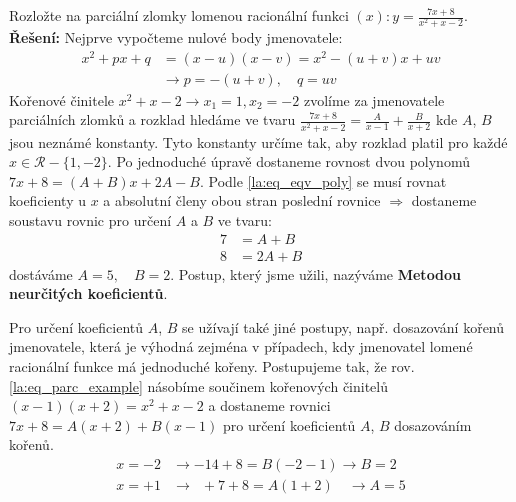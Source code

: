 \begin{example}\label{mai:exam015}
  Rozložte na parciální zlomky lomenou racionální funkci \((x):y=\frac{7x+8}{x^2+x-2}\).
  \newline\textbf{Řešení:} Nejprve vypočteme nulové body jmenovatele:
  \begin{align*} 
     x^2+px+q &=(x-u)(x-v) = x^2-(u+v)x+uv            \\
              &\rightarrow p=-(u+v),\quad q=uv
  \end{align*}
  Kořenové činitele  \(x^2+x-2\rightarrow x_1=1, x_2=-2\) zvolíme za jmenovatele parciálních
  zlomků a rozklad hledáme ve tvaru \(\frac{7x+8}{x^2+x-2}=\frac{A}{x-1}+\frac{B}{x+2}\)
  kde \(A\), \(B\) jsou neznámé konstanty. Tyto konstanty určíme tak, aby rozklad platil pro 
  každé \(x\in\mathcal{R}-\{1,-2\}\). Po jednoduché úpravě dostaneme rovnost dvou polynomů
  \(7x+8=(A+B)x+2A-B\). Podle \ref{la:eq_eqv_poly} se musí rovnat koeficienty u \(x\) a absolutní 
  členy obou stran poslední rovnice \(\Rightarrow\) dostaneme soustavu rovnic pro určení \(A\) a 
  \(B\) ve tvaru:
  \begin{align}
    7 &= A+B  \nonumber \\ 
    8 &= 2A+B \label{la:eq_parc_example}   
  \end{align}
  dostáváme \(A=5,\quad B=2\). Postup, který jsme užili, nazýváme \textbf{Metodou neurčitých 
  koeficientů}.
  
  Pro určení koeficientů \(A\), \(B\) se užívají také jiné postupy, např. dosazování
  kořenů jmenovatele, která je výhodná zejména v případech, kdy jmenovatel lomené racionální
  funkce má jednoduché kořeny. Postupujeme tak, že rov. \ref{la:eq_parc_example} násobíme
  součinem kořenových činitelů \((x-1)(x+2)=x^2+x-2\) a dostaneme rovnici 
  \(7x+8=A(x+2)+B(x-1)\) pro určení koeficientů \(A\), \(B\) dosazováním kořenů.
    \begin{align*}
      x=-2 &\rightarrow       -14+8=B(-2-1)      \rightarrow B=2\\
      x=+1 &\rightarrow  \,\,\,+7+8=A(1+2)\quad  \rightarrow A=5
    \end{align*}
\end{example}